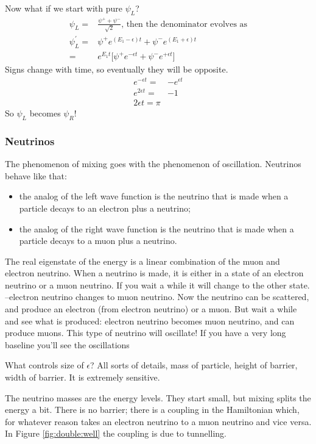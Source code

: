 \documentclass[]{article}
\begin{document}
Now what if we start with pure $\psi_L$?
\begin{align*}
	\psi_L =& \frac{\psi^+ + \psi^-}{\sqrt{2}}\text{, then the denominator evolves as}\\
	\psi_L^\prime =&\psi^+ e^{(E_1-\epsilon)t} + \psi^- e^{(E_1+\epsilon)t}\\
	=&e^{E_1 t}\big[\psi^+ e^{-\epsilon t} + \psi^- e^{+\epsilon t}\big]
\end{align*}
Signs change with time, so eventually they will be opposite.
\begin{align*}
	e^{-\epsilon t} =& - e^{\epsilon t}\\
	e^{2 \epsilon t}=&-1\\
	2 \epsilon t = \pi
\end{align*}
So $\psi_L$ becomes $\psi_R$!

\subsubsection{Neutrinos}

The phenomenon of mixing goes with the phenomenon of oscillation. Neutrinos behave  like that: 
\begin{itemize}
	\item the analog of the left wave function is the neutrino that is made when a particle decays to an electron plus a neutrino;
	\item the analog of the right wave function is the neutrino that is made when a particle decays to a muon plus a neutrino.
\end{itemize}
The real eigenstate of the energy is a linear combination of the muon and electron neutrino. When a neutrino is made, it is either in a state of an electron neutrino or a muon neutrino. If you wait a while it will change to the other state.
--electron neutrino changes to muon neutrino.
Now the neutrino can be scattered, and produce an electron (from electron neutrino) or a muon. But wait a while and see what is produced: electron neutrino becomes muon neutrino, and can produce muons. This type of neutrino will oscillate! If you have a very long baseline you'll see the oscillations

What controls size of $\epsilon$? All sorts of details, mass of particle, height of barrier, width of barrier. It is extremely sensitive. 

The neutrino masses are the energy levels. They start small, but mixing splits the energy a bit. There is no barrier; there is a coupling in the Hamiltonian which, for whatever reason takes an electron neutrino to a muon neutrino and vice versa. In Figure \ref{fig:double:well} the coupling is due to tunnelling.
\end{document}
